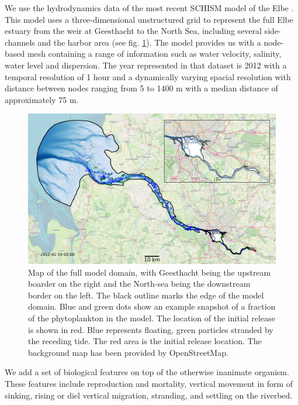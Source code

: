 \documentclass[npg, manuscript]{copernicus}
\begin{document}
We use the hydrodynamics data of the most recent SCHISM model of the Elbe \citep{Pein2021}.
This model uses a three-dimensional unstructured  grid to represent the full Elbe estuary from the weir at Geesthacht to the North Sea, including several side-channels and the harbor area (see fig. \ref{fig:model_domain}). 
The model provides us with a node-based mesh containing a range of information such as water velocity, salinity, water level and dispersion.
The year represented in that dataset is 2012 with a temporal resolution of 1 hour and a dynamically varying spacial resolution with distance between nodes ranging from 5 to 1400 \unit{m} with a median distance of approximately 75 \unit{m}.

\begin{figure}
    \includegraphics[width=12cm]{model_domain.png}
    \caption{Map of the full model domain, with Geesthacht being the upstream boarder on the right and the North-sea being the downstream border on the left. The black outline marks the edge of the model domain. Blue and green dots show an example snapshot of a fraction of the phytoplankton in the model. The location of the initial release is shown in red. Blue represents floating, green particles stranded by the receding tide. The red area is the initial release location. The background map has been provided by OpenStreetMap.}
    \label{fig:model_domain}
\end{figure}

We add a set of biological features on top of the otherwise inanimate organism.
These features include reproduction and mortality, vertical movement in form of sinking, rising or diel vertical migration, stranding, and settling on the riverbed.
\end{document}
